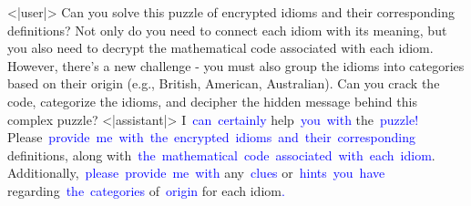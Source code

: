 \documentclass{article}
\begin{document}
\begin{tcolorbox}[colframe=black,colback=white]
<|user|>
Can you solve this puzzle of encrypted idioms and their corresponding definitions? Not only do you need to connect each idiom with its meaning, but you also need to decrypt the mathematical code associated with each idiom. However, there's a new challenge - you must also group the idioms into categories based on their origin (e.g., British, American, Australian). Can you crack the code, categorize the idioms, and decipher the hidden message behind this complex puzzle?
<|assistant|>
I\textcolor{blue}{~can}\textcolor{blue}{~certainly} help\textcolor{blue}{~you}\textcolor{blue}{~with} the\textcolor{blue}{~puzzle}\textcolor{blue}{!} Please\textcolor{blue}{~provide}\textcolor{blue}{~me}\textcolor{blue}{~with}\textcolor{blue}{~the}\textcolor{blue}{~encrypted}\textcolor{blue}{~idi}\textcolor{blue}{oms}\textcolor{blue}{~and}\textcolor{blue}{~their}\textcolor{blue}{~corresponding} definitions, along with\textcolor{blue}{~the}\textcolor{blue}{~mathematical}\textcolor{blue}{~code}\textcolor{blue}{~associated}\textcolor{blue}{~with}\textcolor{blue}{~each}\textcolor{blue}{~id}\textcolor{blue}{iom}. Additionally,\textcolor{blue}{~please}\textcolor{blue}{~provide}\textcolor{blue}{~me}\textcolor{blue}{~with} any\textcolor{blue}{~clues} or\textcolor{blue}{~hints}\textcolor{blue}{~you}\textcolor{blue}{~have} regarding\textcolor{blue}{~the}\textcolor{blue}{~categories} of\textcolor{blue}{~origin} for each idiom\textcolor{blue}{.}\textcolor{blue}{}
\end{tcolorbox}
\end{document}

